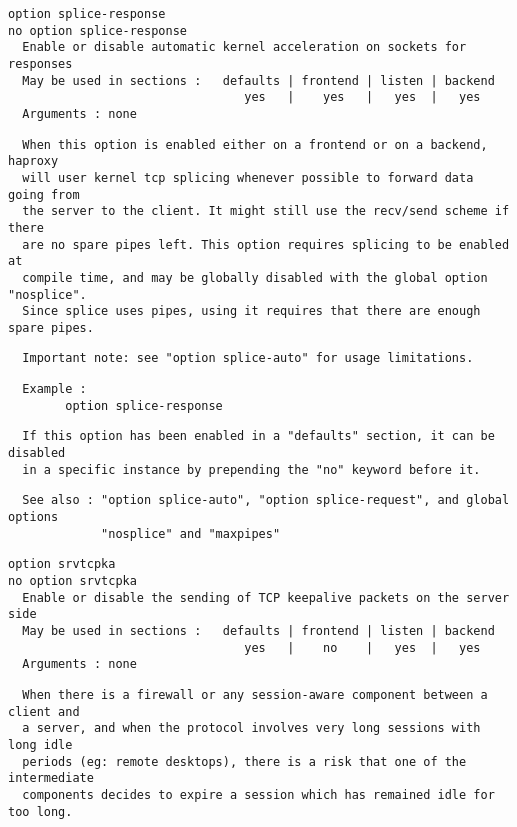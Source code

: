 \begin{verbatim}
option splice-response
no option splice-response
  Enable or disable automatic kernel acceleration on sockets for responses
  May be used in sections :   defaults | frontend | listen | backend
                                 yes   |    yes   |   yes  |   yes
  Arguments : none
\end{verbatim}

\begin{verbatim}
  When this option is enabled either on a frontend or on a backend, haproxy
  will user kernel tcp splicing whenever possible to forward data going from
  the server to the client. It might still use the recv/send scheme if there
  are no spare pipes left. This option requires splicing to be enabled at
  compile time, and may be globally disabled with the global option "nosplice".
  Since splice uses pipes, using it requires that there are enough spare pipes.
\end{verbatim}

\begin{verbatim}
  Important note: see "option splice-auto" for usage limitations.
\end{verbatim}

\begin{verbatim}
  Example :
        option splice-response
\end{verbatim}

\begin{verbatim}
  If this option has been enabled in a "defaults" section, it can be disabled
  in a specific instance by prepending the "no" keyword before it.
\end{verbatim}

\begin{verbatim}
  See also : "option splice-auto", "option splice-request", and global options
             "nosplice" and "maxpipes"
\end{verbatim}

\begin{verbatim}
option srvtcpka
no option srvtcpka
  Enable or disable the sending of TCP keepalive packets on the server side
  May be used in sections :   defaults | frontend | listen | backend
                                 yes   |    no    |   yes  |   yes
  Arguments : none
\end{verbatim}

\begin{verbatim}
  When there is a firewall or any session-aware component between a client and
  a server, and when the protocol involves very long sessions with long idle
  periods (eg: remote desktops), there is a risk that one of the intermediate
  components decides to expire a session which has remained idle for too long.
\end{verbatim}

